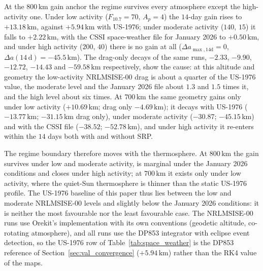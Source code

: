 \vspace{5pt}
\par\noindent At the \(800\,\mathrm{km}\) gain anchor the regime survives every atmosphere except the high-activity one. Under low activity (\(F_{10.7} = 70\), \(A_p = 4\)) the \(14\)-day gain rises to \(+13.18\,\mathrm{km}\), against \(+5.94\,\mathrm{km}\) with US-1976; under moderate activity (\(140\), \(15\)) it falls to \(+2.22\,\mathrm{km}\), with the CSSI space-weather file for January 2026 to \(+0.50\,\mathrm{km}\), and under high activity (\(200\), \(40\)) there is no gain at all (\(\Delta a_{\max,14\mathrm{d}} = 0\), \(\Delta a(14\,\mathrm{d}) = -45.5\,\mathrm{km}\)). The drag-only decays of the same runs, \(-2.33\), \(-9.90\), \(-12.72\), \(-14.43\) and \(-59.58\,\mathrm{km}\) respectively, show the cause: at this altitude and geometry the low-activity NRLMSISE-00 drag is about a quarter of the US-1976 value, the moderate level and the January 2026 file about \(1.3\) and \(1.5\) times it, and the high level about six times. At \(700\,\mathrm{km}\) the same geometry gains only under low activity (\(+10.69\,\mathrm{km}\); drag only \(-4.69\,\mathrm{km}\)); it decays with US-1976 (\(-13.77\,\mathrm{km}\); \(-31.15\,\mathrm{km}\) drag only), under moderate activity (\(-30.87\); \(-45.15\,\mathrm{km}\)) and with the CSSI file (\(-38.52\); \(-52.78\,\mathrm{km}\)), and under high activity it re-enters within the \(14\) days both with and without SRP.

\vspace{5pt}
\par\noindent The regime boundary therefore moves with the thermosphere. At \(800\,\mathrm{km}\) the gain survives under low and moderate activity, is marginal under the January 2026 conditions and closes under high activity; at \(700\,\mathrm{km}\) it exists only under low activity, where the quiet-Sun thermosphere is thinner than the static US-1976 profile. The US-1976 baseline of this paper thus lies between the low and moderate NRLMSISE-00 levels and slightly below the January 2026 conditions: it is neither the most favourable nor the least favourable case. The NRLMSISE-00 runs use Orekit's implementation with its own conventions (geodetic altitude, co-rotating atmosphere), and all runs use the DP853 integrator with eclipse event detection, so the US-1976 row of Table~\ref{tab:space_weather} is the DP853 reference of Section~\ref{sec:val_convergence} (\(+5.94\,\mathrm{km}\)) rather than the RK4 value of the maps.

